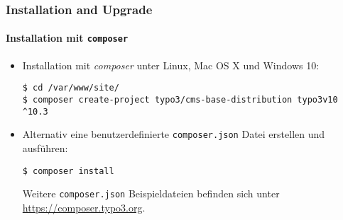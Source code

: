 
\begin{frame}[fragile]
	\frametitle{Installation and Upgrade}
	\framesubtitle{Installation mit \texttt{composer}}

	\begin{itemize}
		\item Installation mit \textit{composer} unter Linux, Mac OS X und Windows 10:
\begin{lstlisting}
$ cd /var/www/site/
$ composer create-project typo3/cms-base-distribution typo3v10 ^10.3
\end{lstlisting}

		\item Alternativ eine benutzerdefinierte \texttt{composer.json} Datei erstellen und ausführen:
\begin{lstlisting}
$ composer install
\end{lstlisting}

			Weitere \texttt{composer.json} Beispieldateien befinden sich unter\newline
			\smaller
				\href{https://composer.typo3.org}{https://composer.typo3.org}.
			\normalsize

	\end{itemize}
\end{frame}

